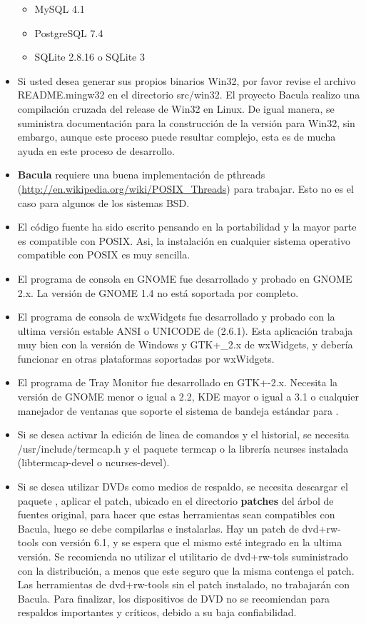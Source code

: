 \begin{itemize}
\begin{itemize}
\item MySQL 4.1 
\item PostgreSQL 7.4 
\item SQLite 2.8.16 o SQLite 3 
\end{itemize}
\item Si usted desea generar sus propios binarios Win32, por favor revise el archivo
README.mingw32 en el directorio src/win32. El proyecto Bacula realizo una compilación
cruzada del release de Win32 en Linux. De igual manera, se suministra documentación
para la construcción de la versión para Win32, sin embargo, aunque este proceso
puede resultar complejo, esta es de mucha ayuda en este proceso de desarrollo. 
\item \textbf{Bacula} requiere una buena implementación de pthreads (\url{http://en.wikipedia.org/wiki/POSIX_Threads})
para trabajar. Esto no es el caso para algunos de los sistemas BSD. 
\item El código fuente ha sido escrito pensando en la portabilidad y la mayor parte
es compatible con POSIX. Asi, la instalación en cualquier sistema operativo
compatible con POSIX es muy sencilla. 
\item El programa de consola en GNOME fue desarrollado y probado en GNOME 2.x. La
versión de GNOME 1.4 no está soportada por completo. 
\item El programa de consola de wxWidgets fue desarrollado y probado con la ultima
versión estable ANSI o UNICODE de 
(2.6.1). Esta aplicación trabaja muy bien con la versión de Windows y GTK+\_2.x
de wxWidgets, y debería funcionar en otras plataformas soportadas por wxWidgets. 
\item El programa de Tray Monitor fue desarrollado en GTK+-2.x. Necesita la versión
de GNOME menor o igual a 2.2, KDE mayor o igual a 3.1 o cualquier manejador
de ventanas que soporte el sistema de bandeja estándar para . 
\item Si se desea activar la edición de linea de comandos y el historial, se necesita
/usr/include/termcap.h y el paquete termcap o la librería ncurses instalada
(libtermcap-devel o ncurses-devel). 
\item Si se desea utilizar DVDs como medios de respaldo, se necesita descargar el
paquete ,
aplicar el patch, ubicado en el directorio \textbf{patches} del árbol de fuentes
original, para hacer que estas herramientas sean compatibles con Bacula, luego
se debe compilarlas e instalarlas. Hay un patch de dvd+rw-tools con versión
6.1, y se espera que el mismo esté integrado en la ultima versión. Se recomienda
no utilizar el utilitario de dvd+rw-tols suministrado con la distribución, a
menos que este seguro que la misma contenga el patch. Las herramientas de dvd+rw-tools
sin el patch instalado, no trabajarán con Bacula. Para finalizar, los dispositivos
de DVD no se recomiendan para respaldos importantes y críticos, debido a su
baja confiabilidad. 
\end{itemize}
